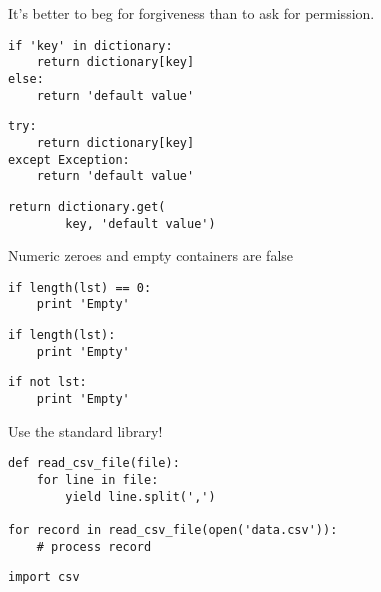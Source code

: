 \documentclass[10pt]{article}
\newenvironment{items}{\begin{itemize*}\setlength\itemsep{0pt}\setlength\parskip{0pt}\setlength\parsep{0pt}}{\end{itemize*}}
\begin{document}
\begin{items}
\item It's better to beg for forgiveness than to ask for permission.
\begin{multicols}{3}\small
\colorbox{silver}{\hspace{0.8\columnwidth}}
\begin{verbatim}
if 'key' in dictionary:
    return dictionary[key]
else:
    return 'default value'
\end{verbatim}
\columnbreak
\colorbox{silver}{\hspace{0.8\columnwidth}}
\begin{verbatim}
try:
    return dictionary[key]
except Exception:
    return 'default value'
\end{verbatim}
\columnbreak
\colorbox{silver}{\hspace{0.8\columnwidth}}
\begin{verbatim}
return dictionary.get(
        key, 'default value')
\end{verbatim}
\end{multicols}

\item Numeric zeroes and empty containers are false
\begin{multicols}{3}\small
\colorbox{silver}{\hspace{0.8\columnwidth}}
\begin{verbatim}
if length(lst) == 0:
    print 'Empty'
\end{verbatim}
\columnbreak
\colorbox{silver}{\hspace{0.8\columnwidth}}
\begin{verbatim}
if length(lst):
    print 'Empty'
\end{verbatim}
\columnbreak
\colorbox{silver}{\hspace{0.8\columnwidth}}
\begin{verbatim}
if not lst:
    print 'Empty'
\end{verbatim}
\columnbreak
\end{multicols}

\item Use the standard library!
\begin{multicols}{2}\small
\colorbox{silver}{\hspace{0.8\columnwidth}}
\begin{verbatim}
def read_csv_file(file):
    for line in file:
        yield line.split(',')

for record in read_csv_file(open('data.csv')):
    # process record
\end{verbatim}
\columnbreak
\colorbox{silver}{\hspace{0.8\columnwidth}}
\begin{verbatim}
import csv


\end{verbatim}
\end{multicols}
\end{items}
\end{document}
